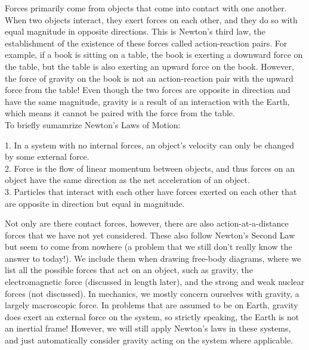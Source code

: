 Forces primarily come from objects that come into contact with one another. When two objects interact, they exert forces on each other, and they do so with equal magnitude in opposite directions. This is Newton's third law, the establishment of the existence of these forces called action-reaction pairs. For example, if a book is sitting on a table, the book is exerting a downward force on the table, but the table is also exerting an upward force on the book. However, the force of gravity on the book is not an action-reaction pair with the upward force from the table! Even though the two forces are opposite in direction and have the same magnitude, gravity is a result of an interaction with the Earth, which means it cannot be paired with the force from the table.\\
To briefly sumamrize Newton's Laws of Motion: 
\begin{mdframed}[frametitle=Newton's Laws of Motion]
	1. In a system with no internal forces, an object's velocity can only be changed by some external force.\\
	2. Force is the flow of linear momentum between objects, and thus forces on an object have the same direction as the net acceleration of an object.\\
	3. Particles that interact with each other have forces exerted on each other that are opposite in direction but equal in magnitude. 
\end{mdframed}
Not only are there contact forces, however, there are also action-at-a-distance forces that we have not yet considered. These also follow Newton's Second Law but seem to come from nowhere (a problem that we still don't really know the answer to today!). We include them when drawing free-body diagrams, where we list all the possible forces that act on an object, such as gravity, the electromagnetic force (discussed in length later), and the strong and weak nuclear forces (not discussed). In mechanics, we mostly concern ourselves with gravity, a largely macroscopic force. In problems that are assumed to be on Earth, gravity does exert an external force on the system, so strictly speaking, the Earth is not an inertial frame! However, we will still apply Newton's laws in these systems, and just automatically consider gravity acting on the system where applicable. 
